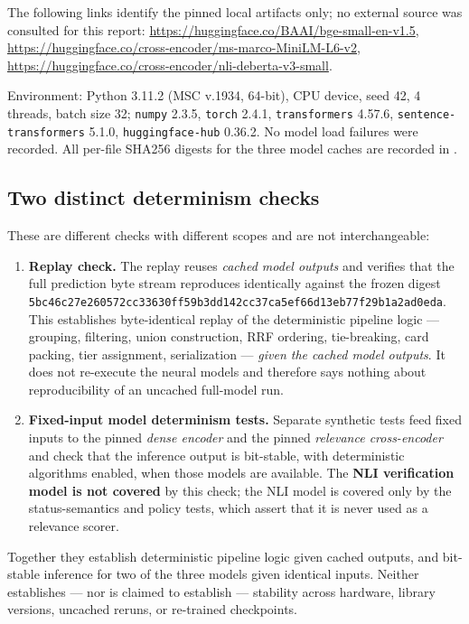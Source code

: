 \documentclass[11pt,a4paper]{article}
\newcommand{\hx}[2]{\texttt{#1}\allowbreak\texttt{#2}}
\begin{document}
The following links identify the pinned local artifacts only; no external source was consulted for this
report: \url{https://huggingface.co/BAAI/bge-small-en-v1.5},
\url{https://huggingface.co/cross-encoder/ms-marco-MiniLM-L6-v2},
\url{https://huggingface.co/cross-encoder/nli-deberta-v3-small}.

Environment: Python 3.11.2 (MSC v.1934, 64-bit), CPU device, seed 42, 4 threads, batch size 32;
\texttt{numpy} 2.3.5, \texttt{torch} 2.4.1, \texttt{transformers} 4.57.6,
\texttt{sentence-transformers} 5.1.0, \texttt{huggingface-hub} 0.36.2. No model load failures were recorded.
All per-file SHA256 digests for the three model caches are recorded in
.

\subsection{Two distinct determinism checks}

These are different checks with different scopes and are not interchangeable:

\begin{enumerate}
\item \textbf{Replay check.} The replay reuses \emph{cached model outputs} and verifies that the full
prediction byte stream reproduces identically against the frozen digest \\
\hx{5bc46c27e260572cc33630ff59b3dd14}{2cc37ca5ef66d13eb77f29b1a2ad0eda}. \\
This establishes byte-identical replay of the deterministic pipeline logic --- grouping, filtering, union
construction, RRF ordering, tie-breaking, card packing, tier assignment, serialization --- \emph{given the
cached model outputs}. It does not re-execute the neural models and therefore says nothing about
reproducibility of an uncached full-model run.
\item \textbf{Fixed-input model determinism tests.} Separate synthetic tests feed fixed inputs to the pinned
\emph{dense encoder} and the pinned \emph{relevance cross-encoder} and check that the inference output is
bit-stable, with deterministic algorithms enabled, when those models are available. The \textbf{NLI
verification model is not covered} by this check; the NLI model is covered only by the status-semantics and
policy tests, which assert that it is never used as a relevance scorer.
\end{enumerate}

Together they establish deterministic pipeline logic given cached outputs, and bit-stable inference for two
of the three models given identical inputs. Neither establishes --- nor is claimed to establish ---
stability across hardware, library versions, uncached reruns, or re-trained checkpoints.
\end{document}
